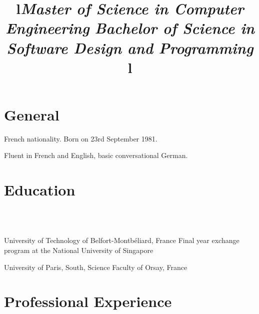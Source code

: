\documentclass[overlapped,line,letterpaper]{res}
\begin{document}
\begin{resume}


  \section{\bf General}
  French nationality. Born on 23rd September 1981.

  Fluent in French and English, basic conversational German.


  \section{\bf Education}

  \begin{format}
    \title{l}\\
    \body\\
  \end{format}

  \title{\em Master of Science in Computer Engineering }
  \begin{position}
    University of Technology of Belfort-Montb\'{e}liard, France\newline
    Final year exchange program at the National University of Singapore
  \end{position}

  \title{\em Bachelor of Science in Software Design and Programming }
  \begin{position}
    University of Paris, South, Science Faculty of Orsay, France
  \end{position}


  \section{\bf Professional Experience}


  \begin{format}
    \title{l}\\
    \\
    \body\\
  \end{format}


\end{resume}
\end{document}
